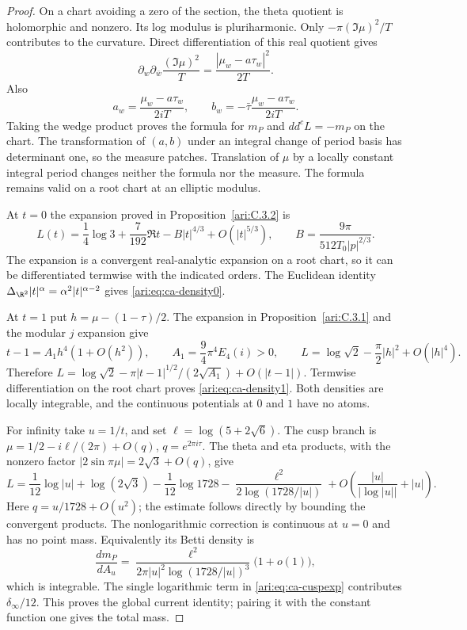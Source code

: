 \begin{proof}
On a chart avoiding a zero of the section, the theta quotient
is holomorphic and nonzero. Its log modulus is pluriharmonic.
Only $-\pi(\Im\mu)^2/T$ contributes to the curvature.
Direct differentiation of this real quotient gives
\[
 \partial_w\partial_{\bar w}\frac{(\Im\mu)^2}{T}
       =\frac{|\mu_w-a\tau_w|^2}{2T}.
\]
Also
\[
 a_w=\frac{\mu_w-a\tau_w}{2iT},\qquad
 b_w=-\bar\tau\frac{\mu_w-a\tau_w}{2iT}.
\]
Taking the wedge product proves the formula for $m_P$ and
$dd^cL=-m_P$ on the chart. The transformation of $(a,b)$
under an integral change of period basis has determinant one,
so the measure patches. Translation of $\mu$ by a locally
constant integral period changes neither the formula nor
the measure. The formula remains valid on a root chart
at an elliptic modulus.

At $t=0$ the expansion proved in Proposition~\ref{ari:C.3.2} is
\[
 L(t)=\frac14\log3+\frac7{192}\Re t
       -B|t|^{4/3}+O(|t|^{5/3}),\qquad
 B=\frac{9\pi}{512T_0|p|^{2/3}}.
\]
The expansion is a convergent real-analytic expansion on a
root chart, so it can be differentiated termwise with the
indicated orders. The Euclidean identity
$\Delta_{\R^2}|t|^\alpha=\alpha^2|t|^{\alpha-2}$ gives
\eqref{ari:eq:ca-density0}.

At $t=1$ put $h=\mu-(1-\tau)/2$. The expansion in Proposition~\ref{ari:C.3.1}
and the modular $j$ expansion give
\[
 t-1=A_1h^4(1+O(h^2)),\qquad
 A_1=\frac94\pi^4E_4(i)>0,\qquad
 L=\log\sqrt2-\frac\pi2|h|^2+O(|h|^4).
\]
Therefore
$L=\log\sqrt2-\pi|t-1|^{1/2}/(2\sqrt{A_1})+O(|t-1|)$.
Termwise differentiation on the root chart proves
\eqref{ari:eq:ca-density1}. Both densities are locally integrable,
and the continuous potentials at $0$ and $1$ have no atoms.

For infinity take $u=1/t$, and set $\ell=\log(5+2\sqrt6)$.
The cusp branch is
$\mu=1/2-i\ell/(2\pi)+O(q)$, $q=e^{2\pi i\tau}$.
The theta and eta products, with the nonzero factor
$|2\sin\pi\mu|=2\sqrt3+O(q)$, give
\begin{equation}\label{ari:eq:ca-cuspexp}
 L=\frac1{12}\log|u|+\log(2\sqrt3)-\frac1{12}\log1728
          -\frac{\ell^2}{2\log(1728/|u|)}
          +O\left(\frac{|u|}{|\log|u||}+|u|\right).
\end{equation}
Here $q=u/1728+O(u^2)$; the estimate follows directly by
bounding the convergent products. The nonlogarithmic
correction is continuous at $u=0$ and has no point mass.
Equivalently its Betti density is
\[
 \frac{dm_P}{dA_u}
  =\frac{\ell^2}{2\pi|u|^2\log(1728/|u|)^3}
       \bigl(1+o(1)\bigr),
\]
which is integrable. The single logarithmic term in
\eqref{ari:eq:ca-cuspexp} contributes $\delta_\infty/12$.
This proves the global current identity; pairing it with
the constant function one gives the total mass.
\end{proof}

